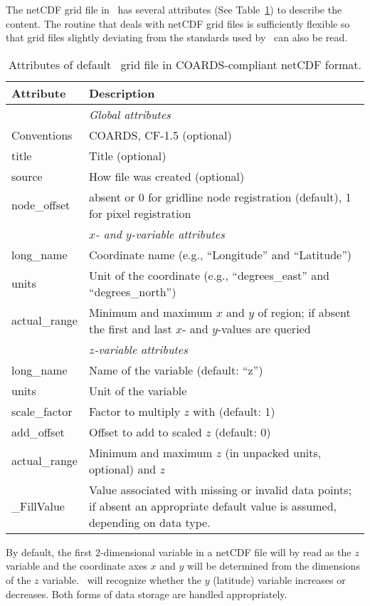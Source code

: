 The netCDF grid file in \GMT\ has several attributes (See Table~\ref{tbl:netcdf-format})
to describe the content. The routine
that deals with netCDF grid files is sufficiently flexible so that grid files slightly deviating
from the standards used by \GMT\ can also be read.

\begin{table}
\centering
\begin{tabular}{lp{}} \hline
  \textbf{Attribute}}	& \textbf{Description}} \\ \hline\hline
  					& \emph{Global attributes} \\
  Conventions		& COARDS, CF-1.5 (optional) \\
  title				& Title (optional) \\
  source			& How file was created (optional) \\
  node\_offset		& absent or 0 for gridline node registration (default), 1 for pixel registration \\ \hline
  					& \emph{$x$- and $y$-variable attributes} \\
  long\_name		& Coordinate name (e.g., ``Longitude'' and ``Latitude'') \\
  units				& Unit of the coordinate (e.g., ``degrees\_east'' and ``degrees\_north'') \\
  actual\_range		& Minimum and maximum $x$ and $y$
  of region; if absent the first and last $x$- and $y$-values are
  queried \\ \hline
  					& \emph{$z$-variable attributes} \\
  long\_name		& Name of the variable (default: ``z'') \\
  units				& Unit of the variable \\
  scale\_factor		& Factor to multiply $z$ with (default: 1) \\
  add\_offset		& Offset to add to scaled $z$ (default: 0) \\
  actual\_range		& Minimum and maximum $z$ (in
  unpacked units, optional) and $z$ \\
  \_FillValue			& Value associated with missing or
  invalid data points; if absent an appropriate default value is
  assumed, depending on data type. \\ \hline
\end{tabular}
\caption{Attributes of default \gmt\ grid file in COARDS-compliant netCDF format.}
\label{tbl:netcdf-format}
\end{table}

By default, the first 2-dimensional variable in a netCDF file will by read as the $z$ variable
and the coordinate axes $x$ and $y$ will be determined from the dimensions of the $z$ variable.
\GMT\ will recognize whether the $y$ (latitude) variable increases or decreases. Both forms of
data storage are handled appropriately.

